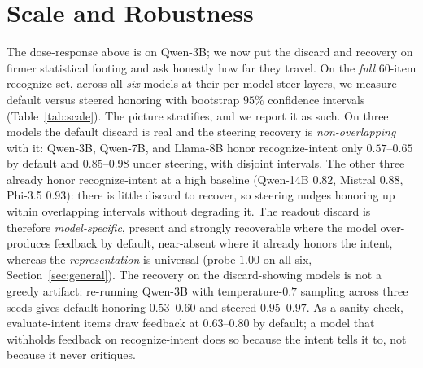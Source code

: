 \documentclass[11pt]{article}
\begin{document}
\section{Scale and Robustness}
\label{sec:scale}
The dose-response above is on Qwen-3B; we now put the discard and recovery on firmer statistical footing and
ask honestly how far they travel. On the \emph{full} 60-item recognize set, across all \emph{six} models at
their per-model steer layers, we measure default versus steered honoring with bootstrap $95\%$ confidence
intervals (Table~\ref{tab:scale}). The picture stratifies, and we report it as such. On three models the
default discard is real and the steering recovery is \emph{non-overlapping} with it: Qwen-3B, Qwen-7B, and
Llama-8B honor recognize-intent only $0.57$--$0.65$ by default and $0.85$--$0.98$ under steering, with
disjoint intervals. The other three already honor recognize-intent at a high baseline (Qwen-14B $0.82$,
Mistral $0.88$, Phi-3.5 $0.93$): there is little discard to recover, so steering nudges honoring up within
overlapping intervals without degrading it. The readout discard is therefore \emph{model-specific}, present and
strongly recoverable where the model over-produces feedback by default, near-absent where it already honors the
intent, whereas the \emph{representation} is universal (probe $1.00$ on all six, Section~\ref{sec:general}). The
recovery on the discard-showing models is not a greedy artifact: re-running Qwen-3B with temperature-$0.7$
sampling across three seeds gives default honoring $0.53$--$0.60$ and steered $0.95$--$0.97$. As a sanity check,
evaluate-intent items draw feedback at $0.63$--$0.80$ by default; a model that withholds feedback on
recognize-intent does so because the intent tells it to, not because it never critiques.
\end{document}
